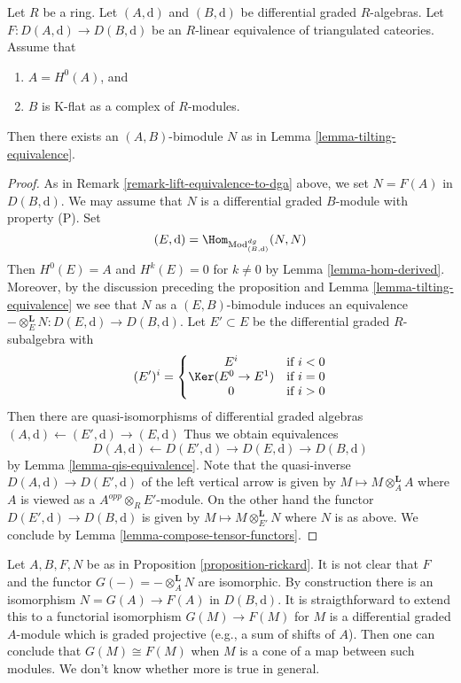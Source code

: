 \begin{proposition}
\label{proposition-rickard}
Let $R$ be a ring. Let $(A, \text{d})$ and $(B, \text{d})$ be
differential graded $R$-algebras.
Let $F : D(A, \text{d}) \to D(B, \text{d})$ be an $R$-linear
equivalence of triangulated cateories. Assume that
\begin{enumerate}
\item $A = H^0(A)$, and
\item $B$ is K-flat as a complex of $R$-modules.
\end{enumerate}
Then there exists an $(A, B)$-bimodule $N$ as in
Lemma \ref{lemma-tilting-equivalence}.
\end{proposition}

\begin{proof}
As in Remark \ref{remark-lift-equivalence-to-dga} above, we set
$N = F(A)$ in $D(B, \text{d})$.
We may assume that $N$ is a differential graded $B$-module with
property (P). Set
$$
(E, \text{d}) = \Hom_{\text{Mod}^{dg}_{(B, \text{d})}}(N, N)
$$
Then $H^0(E) = A$ and $H^k(E) = 0$ for $k \not = 0$ by
Lemma \ref{lemma-hom-derived}.
Moreover, by the discussion preceding the proposition and
Lemma \ref{lemma-tilting-equivalence}
we see that $N$ as a $(E, B)$-bimodule induces an
equivalence $- \otimes_E^\mathbf{L} N : D(E, \text{d}) \to D(B, \text{d})$.
Let $E' \subset E$ be the differential graded $R$-subalgebra
with
$$
(E')^i = \left\{
\begin{matrix}
E^i & \text{if }i < 0 \\
\Ker(E^0 \to E^1) & \text{if }i = 0 \\
0 & \text{if }i > 0
\end{matrix}
\right.
$$
Then there are quasi-isomorphisms of differential graded
algebras $(A, \text{d}) \leftarrow (E', \text{d}) \rightarrow (E, \text{d})$
Thus we obtain equivalences
$$
D(A, \text{d}) \leftarrow D(E', \text{d}) \rightarrow D(E, \text{d})
\rightarrow D(B, \text{d})
$$
by Lemma \ref{lemma-qis-equivalence}.
Note that the quasi-inverse $D(A, \text{d}) \to D(E', \text{d})$
of the left vertical arrow is given
by $M \mapsto M \otimes_A^\mathbf{L} A$ where $A$ is viewed as a
$A^{opp} \otimes_R E'$-module. On the other hand the functor
$D(E', \text{d}) \to D(B, \text{d})$ is given by
$M \mapsto M \otimes_{E'}^\mathbf{L} N$ where $N$ is as above.
We conclude by Lemma \ref{lemma-compose-tensor-functors}.
\end{proof}

\begin{remark}
\label{remark-rickard}
Let $A, B, F, N$ be as in Proposition \ref{proposition-rickard}.
It is not clear that $F$ and the functor
$G(-) = - \otimes_A^\mathbf{L} N$ are isomorphic.
By construction there is an isomorphism
$N = G(A) \to F(A)$ in $D(B, \text{d})$.
It is straigthforward to extend this to a functorial isomorphism
$G(M) \to F(M)$ for $M$ is a differential graded $A$-module which
is graded projective (e.g., a sum of shifts of $A$).
Then one can conclude that $G(M) \cong F(M)$ when $M$ is a cone
of a map between such modules. We don't know whether more is true
in general.
\end{remark}


